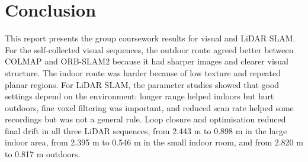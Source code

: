 \documentclass[conference]{IEEEtran}
\begin{document}
\FloatBarrier

\section{Conclusion}
\label{sec:conclusion}

This report presents the group coursework results for visual and LiDAR SLAM. For the self-collected visual sequences, the outdoor route agreed better between COLMAP and ORB-SLAM2 because it had sharper images and clearer visual structure. The indoor route was harder because of low texture and repeated planar regions. For LiDAR SLAM, the parameter studies showed that good settings depend on the environment: longer range helped indoors but hurt outdoors, fine voxel filtering was important, and reduced scan rate helped some recordings but was not a general rule. Loop closure and optimisation reduced final drift in all three LiDAR sequences, from 2.443 m to 0.898 m in the large indoor area, from 2.395 m to 0.546 m in the small indoor room, and from 2.820 m to 0.817 m outdoors.

\end{document}
